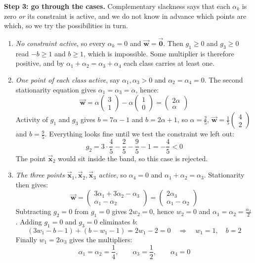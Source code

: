 \documentclass[]{article}
\newcommand{\vecx}{ \vec{\mathbf{x}} }
\newcommand{\vecw}{ \vec{\mathbf{w}} }
\begin{document}
	\noindent \textbf{Step 3: go through the cases.}
	Complementary slackness says that each $\alpha_k$ is zero \textit{or} its constraint is active, and we do not know in advance which points are which, so we try the possibilities in turn.

	\begin{enumerate}
		\item \textit{No constraint active}, so every $\alpha_k = 0$ and $\vecw = \vec{\mathbf{0}}$.
		Then $g_1 \geq 0$ and $g_3 \geq 0$ read $-b \geq 1$ and $b \geq 1$, which is impossible.
		Some multiplier is therefore positive, and by $\alpha_1 + \alpha_2 = \alpha_3 + \alpha_4$ each class carries at least one.

		\item \textit{One point of each class active}, say $\alpha_1, \alpha_3 > 0$ and $\alpha_2 = \alpha_4 = 0$.
		The second stationarity equation gives $\alpha_1 = \alpha_3 = \alpha$, hence:
		$$
		\vecw = \alpha \begin{pmatrix} 3 \\ 1 \end{pmatrix} - \alpha \begin{pmatrix} 1 \\ 0 \end{pmatrix} = \begin{pmatrix} 2\alpha \\ \alpha \end{pmatrix}
		$$
		Activity of $g_1$ and $g_3$ gives $b = 7\alpha - 1$ and $b = 2\alpha + 1$, so $\alpha = \frac{2}{5}$, $\vecw = \frac{1}{5}\begin{pmatrix} 4 \\ 2 \end{pmatrix}$ and $b = \frac{9}{5}$.
		Everything looks fine until we test the constraint we left out:
		$$
		g_2 = 3 \cdot \frac{4}{5} - \frac{2}{5} - \frac{9}{5} - 1 = -\frac{4}{5} < 0
		$$
		The point $\vecx_2$ would sit inside the band, so this case is rejected.

		\item \textit{The three points $\vecx_1, \vecx_2, \vecx_3$ active}, so $\alpha_4 = 0$ and $\alpha_1 + \alpha_2 = \alpha_3$.
		Stationarity then gives:
		$$
		\vecw = \begin{pmatrix} 3\alpha_1 + 3\alpha_2 - \alpha_3 \\ \alpha_1 - \alpha_2 \end{pmatrix}
		= \begin{pmatrix} 2 \alpha_3 \\ \alpha_1 - \alpha_2 \end{pmatrix}
		$$
		Subtracting $g_2 = 0$ from $g_1 = 0$ gives $2 w_2 = 0$, hence $w_2 = 0$ and $\alpha_1 = \alpha_2 = \frac{\alpha_3}{2}$.
		Adding $g_1 = 0$ and $g_3 = 0$ eliminates $b$:
		$$
		\left( 3 w_1 - b - 1 \right) + \left( b - w_1 - 1 \right) = 2 w_1 - 2 = 0
		\quad \Longrightarrow \quad
		w_1 = 1,
		\quad b = 2
		$$
		Finally $w_1 = 2 \alpha_3$ gives the multipliers:
		$$
		\alpha_1 = \alpha_2 = \frac{1}{4},
		\qquad
		\alpha_3 = \frac{1}{2},
		\qquad
		\alpha_4 = 0
		$$
	\end{enumerate}
\end{document}
